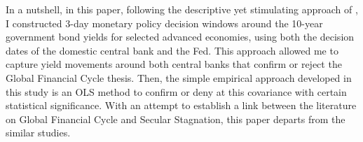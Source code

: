 In a nutshell, in this paper, following the descriptive yet stimulating approach of \citet{hillenbrand2022}, I constructed 3-day monetary policy decision windows around the 10-year government bond yields for selected advanced economies, using both the decision dates of the domestic central bank and the Fed. This approach allowed me to capture yield movements around both central banks that confirm or reject the Global Financial Cycle thesis. Then, the simple empirical approach developed in this study is an OLS method to confirm or deny at this covariance with certain statistical significance. With an attempt to establish a link between the literature on Global Financial Cycle and Secular Stagnation, this paper departs from the similar studies.